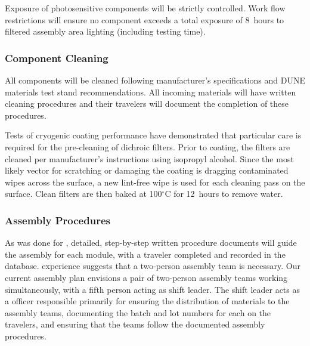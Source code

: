 
Exposure of photosensitive components will be strictly controlled.  Work flow restrictions will %
ensure no component exceeds a total exposure of \SI{8}{hours} to filtered assembly area lighting (including testing time).

\subsubsection{Component Cleaning}

All components will be cleaned %
following manufacturer's specifications and DUNE materials test stand recommendations.  %
All incoming materials will have written cleaning procedures and their travelers will document the completion of these procedures.

Tests of cryogenic coating performance have demonstrated that particular care is required for the pre-cleaning of dichroic filters.  Prior to coating, the filters are cleaned per manufacturer's instructions %
using isopropyl alcohol. Since the most likely vector for scratching or damaging the coating is dragging contaminated wipes across the surface, a new %
lint-free wipe is used for each  cleaning pass on the surface. Clean filters are then baked at 100$^\circ$C for \SI{12}{hours} to remove water. 

\subsubsection{Assembly Procedures}

As was done for , detailed, step-by-step written procedure documents will %
guide the assembly for each  module, with a  traveler%
completed and recorded in the database.   experience suggests that a two-person assembly team is necessary. %
Our current assembly plan envisions a pair of two-person assembly teams working simultaneously, %
with a fifth person acting as shift leader.  The shift leader %
acts as a  officer responsible primarily for ensuring the distribution of materials to the assembly teams, documenting the batch and lot numbers for each  on the %
travelers, and ensuring that the teams follow the documented assembly procedures. %

